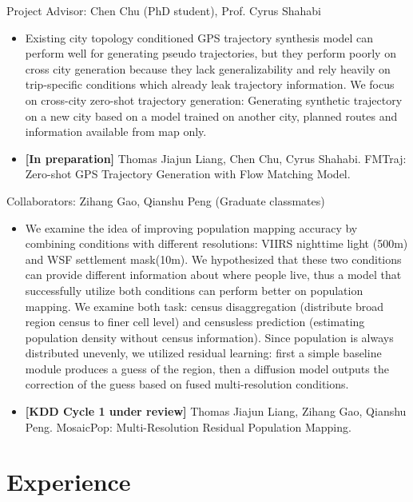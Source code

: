 \documentclass{resume}
\begin{document}
Project Advisor: Chen Chu (PhD student), Prof. Cyrus Shahabi
\begin{itemize}
\item Existing city topology conditioned GPS trajectory synthesis model can perform well for generating pseudo trajectories, but they perform poorly on cross city generation because they lack generalizability and rely heavily on trip-specific conditions which already leak trajectory information. We focus on cross-city zero-shot trajectory generation: Generating synthetic trajectory on a new city based on a model trained on another city, planned routes and information available from map only.
\item \textbf{[In preparation]} Thomas Jiajun Liang, Chen Chu, Cyrus Shahabi. FMTraj: Zero-shot GPS Trajectory Generation with Flow Matching Model.
\end{itemize}

Collaborators: Zihang Gao, Qianshu Peng (Graduate classmates)
\begin{itemize}
\item We examine the idea of improving population mapping accuracy by combining conditions with different resolutions: VIIRS nighttime light (500m) and WSF settlement mask(10m). We hypothesized that these two conditions can provide different information about where people live, thus a model that successfully utilize both conditions can perform better on population mapping. We examine both task: census disaggregation (distribute broad region census to finer cell level) and censusless prediction (estimating population density without census information). Since population is always distributed unevenly, we utilized residual learning: first a simple baseline module produces a guess of the region, then a diffusion model outputs the correction of the guess based on fused multi-resolution conditions.
\item \textbf{[KDD Cycle 1 under review]} Thomas Jiajun Liang, Zihang Gao, Qianshu Peng. MosaicPop: Multi-Resolution Residual Population Mapping.
\end{itemize}

\section{Experience}
\end{document}
